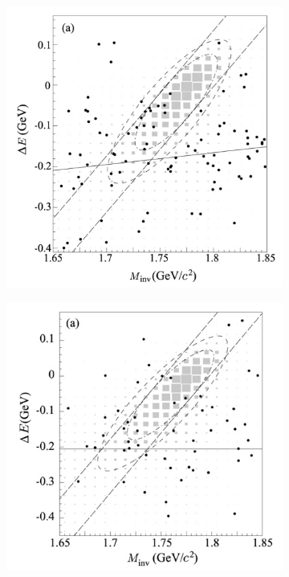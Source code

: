 \documentclass[12pt]{thesis}  %
\begin{document}
   \begin{figure}[h]
        \centering
        \begin{subfigure}[b]{0.475\textwidth}
            \centering
            \includegraphics[width=\textwidth]{images/belle-search-tauMG-signal-region.png}
            \caption[Network2]%
            {{\small}}    
            \label{fig:mean and std of net14}
        \end{subfigure}
        \hfill
        \begin{subfigure}[b]{0.475\textwidth}  
            \centering 
            \includegraphics[width=\textwidth]{images/belle-search-tauEG-signal-region.png}

\end{subfigure}
\end{figure}
\end{document}
